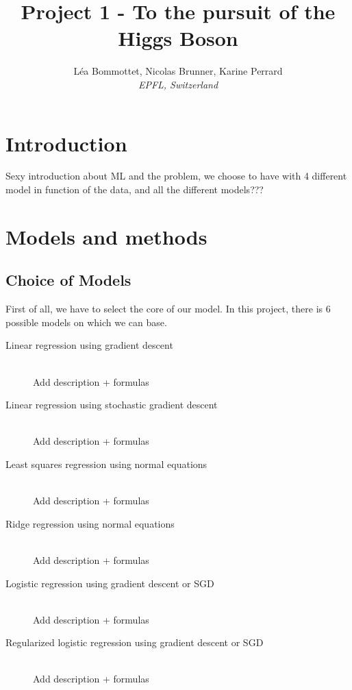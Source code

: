 \documentclass[10pt,conference,compsocconf]{IEEEtran}
\begin{document}
\title{Project 1 - To the pursuit of the Higgs Boson}

\author{
  L\'ea Bommottet, Nicolas Brunner, Karine Perrard\\
  \textit{ EPFL, Switzerland}
}

\maketitle

\section{Introduction}

Sexy introduction about ML and the problem,
we choose to have  with 4 different model in function of the data, and all the different models???  


\section{Models and methods}

\subsection{Choice of Models}
First of all, we have to select the core of our model. In this project, there is 6 possible models on which we can base.
\begin{description}
	\item[Linear regression using gradient descent] \ \\
	Add description + formulas
	\item[Linear regression using stochastic gradient descent] \ \\
	Add description + formulas
	\item[Least squares regression using normal equations] \ \\
	Add description + formulas
	\item[Ridge regression using normal equations] \ \\
	Add description + formulas
	\item[Logistic regression using gradient descent or SGD] \ \\
	Add description + formulas
	\item[Regularized logistic regression using gradient descent or SGD] \ \\
	Add description + formulas
\end{description}
\end{document}
